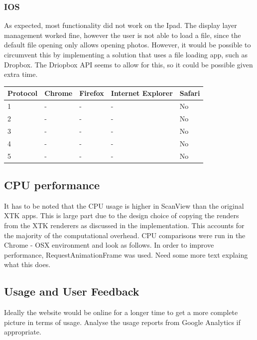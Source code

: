 \documentclass[a4paper,11pt,titlepage]{article}
\begin{document}
\subsubsection*{IOS}

As expected, most functionality did not work on the Ipad. The display layer management worked fine, however the user is not able to load a file, since the default file opening only allows opening photos. However, it would be possible to circumvent this by implementing a solution that uses a file loading app, such as Dropbox. The Driopbox API seems to allow for this, so it could be possible given extra time.

\begin{center}

  \begin{tabular}{ | l || l | l | l | l |}
    \hline
    Protocol & Chrome & Firefox & Internet Explorer & Safari \\ \hline \hline
    1 & - & -  & -  & No \\ \hline
    2 & - & - & - & No \\ \hline
    3 & - & - & - & No \\ \hline
    4 & - & - & - & No \\ \hline
    5 & - & - & - & No \\
    \hline
  \end{tabular}

\end{center}


\subsection{CPU performance}

It has to be noted that the CPU usage is higher in ScanView than the original XTK apps. This is large part due to the design choice of copying the renders from the XTK renderers as discussed in the implementation. This accounts for the majority of the computational overhead. CPU comparisons were run in the Chrome - OSX environment and look as follows.
In order to improve performance, RequestAnimationFrame was used. Need some more text explaing what this does.



\subsection{Usage and User Feedback}


Ideally the website would be online for a longer time to get a more complete picture in terms of usage.
Analyse the usage reports from Google Analytics if appropriate.
\end{document}
